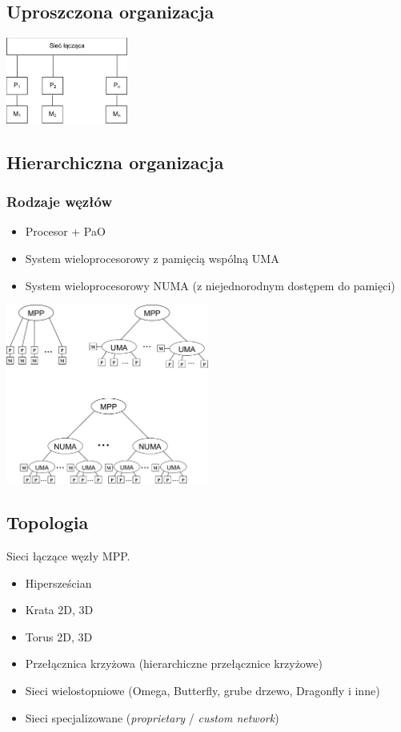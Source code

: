 \documentclass[a4paper,twoside]{article}
\begin{document}
\subsection{Uproszczona organizacja}
\begin{center}
	\includegraphics[width=0.3\textwidth]{./images/MMP01}
\end{center}
\subsection{Hierarchiczna organizacja}\label{subsec:organizacjaMPP}
\subsubsection{Rodzaje węzłów}
\begin{itemize}
	\item Procesor + PaO
	\item System wieloprocesorowy z pamięcią wspólną UMA
	\item System wieloprocesorowy NUMA (z niejednorodnym dostępem do pamięci)
\end{itemize}
\begin{center}
	\includegraphics[width=0.5\textwidth]{./images/MMP02}
\end{center}
\subsection{Topologia}
Sieci łączące węzły MPP.
\begin{itemize}
	\item Hipersześcian
	\item Krata 2D, 3D
	\item Torus 2D, 3D
	\item Przełącznica krzyżowa (hierarchiczne przełącznice krzyżowe)
	\item Sieci wielostopniowe (Omega, Butterfly, grube drzewo, Dragonfly i inne)
	\item Sieci specjalizowane (\emph{proprietary} / \emph{custom network})
\end{itemize}
\end{document}
